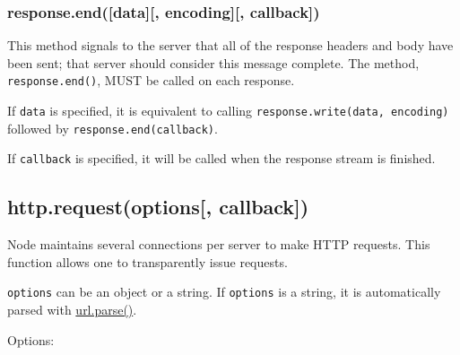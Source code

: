 \subsubsection{response.end({[}data{]}{[}, encoding{]}{[},
callback{]})}\label{response.enddata-encoding-callback}

This method signals to the server that all of the response headers and
body have been sent; that server should consider this message complete.
The method, \texttt{response.end()}, MUST be called on each response.

If \texttt{data} is specified, it is equivalent to calling
\texttt{response.write(data,\ encoding)} followed by
\texttt{response.end(callback)}.

If \texttt{callback} is specified, it will be called when the response
stream is finished.

\subsection{http.request(options{[},
callback{]})}\label{http.requestoptions-callback}

Node maintains several connections per server to make HTTP requests.
This function allows one to transparently issue requests.

\texttt{options} can be an object or a string. If \texttt{options} is a
string, it is automatically parsed with
\href{url.html\#url_url_parse_urlstr_parsequerystring_slashesdenotehost}{url.parse()}.

Options:

